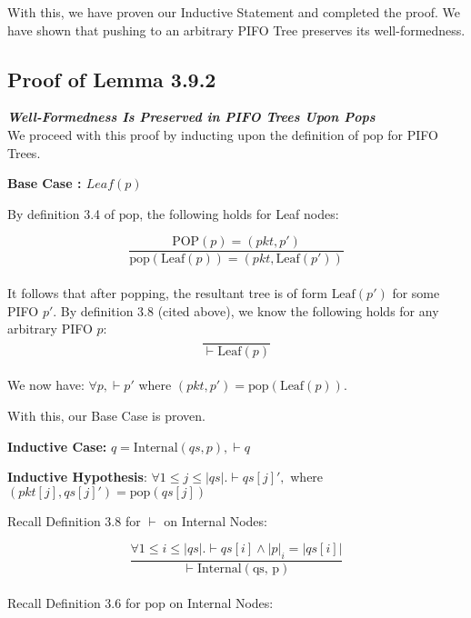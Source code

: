 \documentclass{article}
\begin{document}
With this, we have proven our Inductive Statement and completed the proof. We have shown that pushing to an arbitrary PIFO Tree preserves its well-formedness.\\[-10pt]

\subsection{Proof of Lemma 3.9.2}
\textit{\textbf{Well-Formedness Is Preserved in PIFO Trees Upon Pops}}\\[5pt]

We proceed with this proof by inducting upon the definition of $\text{pop}$ for PIFO Trees.\newline

\textbf{Base Case : $Leaf(p)$}\newline

By definition 3.4 of $\text{pop}$, the following holds for Leaf nodes:

$$\frac{\text{POP}(p) = (pkt, p')}{\text{pop}(\text{Leaf}(p)) = (pkt, \text{Leaf}(p'))}$$\\[-15pt]

It follows that after popping, the resultant tree is of form $\text{Leaf}(p')$ for some PIFO $p'$. By definition 3.8 (cited above), we know the following holds for any arbitrary PIFO $p$:\\[-20pt]

$$\frac{}{\vdash \text{Leaf}(p)}$$\\[-10pt]

We now have: $\forall p, \vdash p'$ where $(pkt, p') = \text{pop}(\text{Leaf}(p))$.\newline

With this, our Base Case is proven.\newline


\textbf{Inductive Case:} $q = \text{Internal}(qs, p), \vdash q$\newline

\textbf{Inductive Hypothesis}: $\forall 1 \leq j \leq |qs|. \vdash qs[j]',$ where $(pkt[j], qs[j]') = \text{pop}(qs[j])$\newline

Recall Definition 3.8 for $\vdash$ on Internal Nodes:

$$\frac{\forall 1 \leq i \leq |qs|. \vdash qs[i] \land |p|_i = |qs[i]|}{\vdash \text{Internal}(\text{qs, p})}$$\\[-10pt]

Recall Definition 3.6 for $\text{pop}$ on Internal Nodes:
\end{document}
